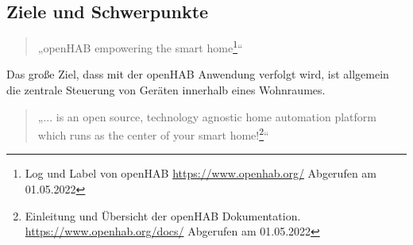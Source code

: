 \subsection{Ziele und Schwerpunkte} 
    \begin{quote}
        „openHAB empowering the smart home\footnote{Log und Label von openHAB \url{https://www.openhab.org/} Abgerufen am 01.05.2022}“
    \end{quote}
    Das große Ziel, dass mit der openHAB Anwendung verfolgt wird, ist allgemein die zentrale Steuerung von Geräten innerhalb eines 
    Wohnraumes.
    \begin{quote}
        „... is an open source, technology agnostic home automation platform which runs as the center of your smart home!\footnote{Einleitung und Übersicht der openHAB Dokumentation. \url{https://www.openhab.org/docs/} Abgerufen am 01.05.2022}“
    \end{quote}
    

